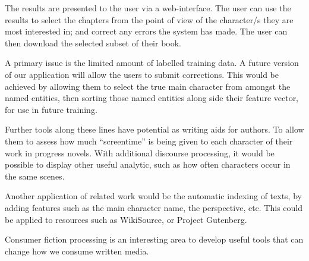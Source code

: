 \documentclass[11pt,a4paper]{article}
\begin{document}
The results are presented to the user via a web-interface.
The user can use the results to select the chapters from the point of view of the character/s they are most interested in;
and correct any errors the system has made.
The user can then download the selected subset of their book.

A primary issue is the limited amount of labelled training data.
A future version of our application will allow the users to submit corrections.
This would be achieved by allowing them to select the true main character from amongst the named entities,
then sorting those named entities along side their feature vector,
for use in future training.


Further tools along these lines have potential as writing aids for authors.
To allow them to assess how much ``screentime'' is being given to each character of their work in progress novels.
With additional discourse processing, it would be possible to display other useful analytic, such as how often characters occur in the same scenes.

Another application of related work would be the automatic indexing of texts,
by adding features such as the main character name, the perspective, etc.
This could be applied to resources such as WikiSource, or Project Gutenberg.

Consumer fiction processing is an interesting area to develop useful tools that can change how we consume written media.


\end{document}
